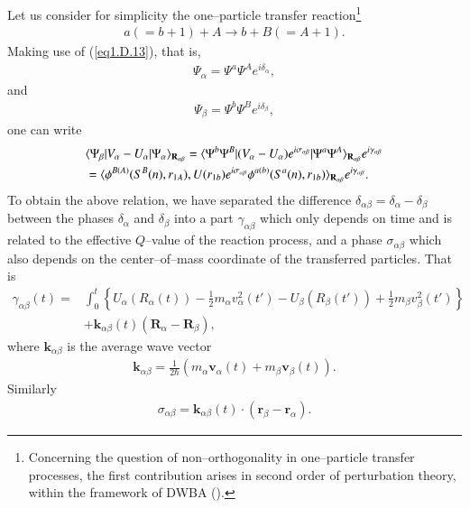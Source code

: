 \begin{subappendices}
 Let us  consider for simplicity the one--particle transfer reaction\footnote{Concerning the question of non--orthogonality in one--particle transfer processes, the first contribution arises in second order of perturbation theory, within the framework of DWBA (\cite{Thompson:09}).}
  \begin{align}\label{eq1.D.28}
a(=b+1)+A\rightarrow b+B(=A+1).
  \end{align}
  Making use of (\ref{eq1.D.13}), that is,
   \begin{align}\label{eq1.D.31}
\Psi_\alpha=\Psi^a\Psi^Ae^{i\delta_\alpha},
   \end{align}
 and
    \begin{align}\label{eq1.D.32}
 \Psi_\beta=\Psi^b\Psi^Be^{i\delta_\beta},
    \end{align}
 one can write
    \begin{align}\label{eq1.D.33}
\nonumber &\langle {\Psi_\beta|V_\alpha-U_\alpha|\Psi_\alpha} \rangle_{\mathbf R_{\alpha\beta}}=\langle {\Psi^b\Psi^B|(V_\alpha-U_\alpha)e^{i\sigma_{\alpha\beta}}|\Psi^a\Psi^A} \rangle_{\mathbf R_{\alpha\beta}}e^{i\gamma_{\alpha\beta}}\\
&=\langle {\phi^{B(A)}(S^B(n),r_{1A}),U(r_{1b})e^{i\sigma_{\alpha\beta}}\phi^{a(b)}(S^a(n),r_{1b})} \rangle_{\mathbf R_{\alpha\beta}}e^{i\gamma_{\alpha\beta}}.
    \end{align}
 To obtain the above relation, we have separated the difference $\delta_{\alpha\beta}=\delta_\alpha-\delta_\beta$ between the phases $\delta_\alpha$ and $\delta_\beta$ into a part $\gamma_{\alpha\beta}$ which only depends on time and is related to the effective $Q$--value of the reaction process, and a phase $\sigma_{\alpha\beta}$ which also depends on the center--of--mass coordinate of the transferred particles. That is
\begin{align}\label{eq1.D.34}
\nonumber \gamma_{\alpha\beta}(t)=&\int_0^t\left\{U_\alpha( R_\alpha(t))-\frac{1}{2}m_\alpha v_\alpha^2(t')-U_\beta(R_\beta (t'))+\frac{1}{2}m_\beta v_\beta^2(t')\right\}\\
&+\mathbf k_{\alpha\beta}(t)(\mathbf R_\alpha-\mathbf R_\beta),
\end{align}
 where $\mathbf k_{\alpha\beta}$ is the average wave vector 
     \begin{align}\label{eq1.D.35}
\mathbf k_{\alpha\beta}=\frac{1}{2\hbar}\left(m_\alpha\mathbf v_\alpha(t)+m_\beta\mathbf v_\beta(t)\right).
     \end{align}
 Similarly
\begin{align}\label{eq1.D.36}
\sigma_{\alpha\beta}=\mathbf k_{\alpha\beta}(t)\cdot(\mathbf r_\beta-\mathbf r_\alpha).

\end{align}
\end{subappendices}
